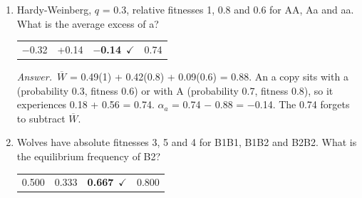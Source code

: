 \documentclass[11pt]{article}
\newcommand{\keyans}[1]{\par\medskip\noindent\textit{Answer.}\ #1\par\medskip}
\begin{document}
\begin{enumerate}[label=\textbf{\arabic*.}, leftmargin=2em, itemsep=1.4em]
\begin{enumerate}[label={}, leftmargin=2.4em, labelwidth=0pt, itemsep=2pt, topsep=0pt]
\item \hspace*{-2.4em}The Hardy-Weinberg genotype frequencies
\item \hspace*{-2.4em}\textbf{The average excess \(\alpha_{a}\)}\ \(\checkmark\)
\item \hspace*{-2.4em}The allele frequency \(q\)
\item \hspace*{-2.4em}Mean fitness \(\overline{W}\)
\end{enumerate}
\keyans{\(q\) and \(\overline{W}\) are always positive, so the sign of the average excess alone decides the direction. This was a question on last year's quiz.}
\item Hardy-Weinberg, \(q\) = 0.3, relative fitnesses 1, 0.8 and 0.6 for AA, Aa and aa. What is the average excess of a?
\nopagebreak\par{}
\par\smallskip\noindent\begin{tabularx}{\linewidth}{@{}YYYY@{}}
\(-\)0.32 & +0.14 & \textbf{\(-\)0.14}\ \(\checkmark\) & 0.74 \\
\end{tabularx}
\keyans{\(\overline{W}\) = 0.49(1) + 0.42(0.8) + 0.09(0.6) = 0.88. An a copy sits with a (probability 0.3, fitness 0.6) or with A (probability 0.7, fitness 0.8), so it experiences 0.18 + 0.56 = 0.74. \(\alpha_{a}\) = 0.74 \(-\) 0.88 = \(-\)0.14. The 0.74 forgets to subtract \(\overline{W}\).}
\item Wolves have absolute fitnesses 3, 5 and 4 for B1B1, B1B2 and B2B2. What is the equilibrium frequency of B2?
\nopagebreak\par{}
\par\smallskip\noindent\begin{tabularx}{\linewidth}{@{}YYYY@{}}
0.500 & 0.333 & \textbf{0.667}\ \(\checkmark\) & 0.800 \\

\end{tabularx}
\end{enumerate}
\end{document}
